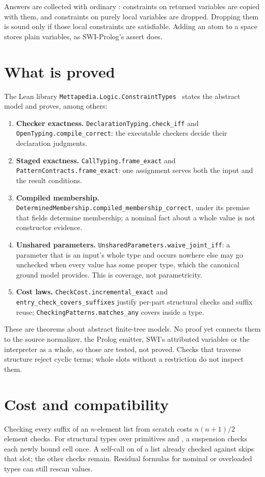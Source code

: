 \documentclass[10pt,a4paper]{article}
\newcommand{\code}[1]{{\frenchspacing\texttt{\detokenize{#1}}}}
\newcommand{\name}[1]{\nolinkurl{#1}}
\begin{document}
Answers are collected with ordinary \code{findall}: constraints on returned
variables are copied with them, and constraints on purely local variables are
dropped. Dropping them is sound only if those local constraints are
satisfiable. Adding an atom to a space stores plain variables, as SWI-Prolog's
assert does.

\section{What is proved}
The Lean library \name{Mettapedia.Logic.ConstraintTypes}~\cite{lean} states the
abstract model and proves, among others:
\begin{enumerate}
\item \textbf{Checker exactness.}
\name{DeclarationTyping.check_iff} and \name{OpenTyping.compile_correct}: the
executable checkers decide their declaration judgments.
\item \textbf{Staged exactness.}
\name{CallTyping.frame_exact} and \name{PatternContracts.frame_exact}: one
assignment serves both the input and the result conditions.
\item \textbf{Compiled membership.}
\name{DeterminedMembership.compiled_membership_correct}, under its premise that
fields determine membership; a nominal fact about a whole value is not
constructor evidence.
\item \textbf{Unshared parameters.}
\name{UnsharedParameters.waive_joint_iff}: a parameter that is an input's
whole type and occurs nowhere else may go unchecked when every value has some
proper type, which the canonical ground model provides. This is coverage, not
parametricity.
\item \textbf{Cost laws.}
\name{CheckCost.incremental_exact} and \name{entry_check_covers_suffixes}
justify per-part structural checks and suffix reuse;
\name{CheckingPatterns.matches_any} covers \code{Atom} inside a type.
\end{enumerate}
These are theorems about abstract finite-tree models. No proof yet connects
them to the source normalizer, the Prolog emitter, SWI's attributed variables
or the interpreter as a whole, so those are tested, not proved. Checks that
traverse structure reject cyclic terms; whole slots without a restriction do
not inspect them.

\section{Cost and compatibility}
Checking every suffix of an $n$-element list from scratch costs
$n(n+1)/2$ element checks. For structural types over primitives and
\code{Atom}, a suspension checks each newly bound cell once. A self-call on
\code{cdr-atom} of a list already checked against \code{(ListOf T)} skips that
slot; the other checks remain. Residual formulas for
nominal or overloaded types can still rescan values.
\end{document}
